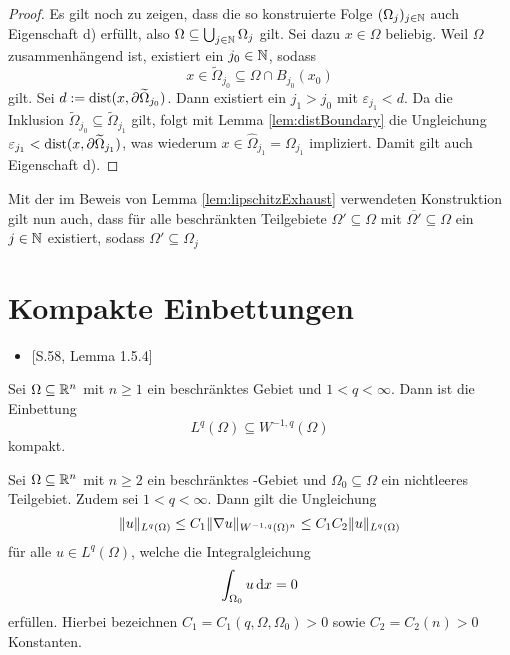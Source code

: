 \begin{proof}
  Es gilt noch zu zeigen, dass die so konstruierte Folge $(\Omega_j)_{j \in \mathbb{N}}$ auch Eigenschaft d) erfüllt, also $ \Omega \subseteq \bigcup_{j \in \mathbb{N}} \Omega_j $ gilt.
  Sei dazu $x \in \Omega$ beliebig.
  Weil $\Omega$ zusammenhängend ist, existiert ein $j_0 \in \mathbb{N}$, sodass
  $$
  x \in \widetilde\Omega_{j_0} \subseteq \Omega \cap B_{j_0}(x_0)
  $$
  gilt.
  Sei $d:=\operatorname{dist}(x, \partial\widetilde\Omega_{j_0})$.
  Dann existiert ein $j_1 > j_0$ mit $\varepsilon_{j_1} < d$.
  Da die Inklusion $\widetilde\Omega_{j_0} \subseteq \widetilde\Omega_{j_1}$ gilt, folgt mit Lemma \ref{lem:distBoundary} die Ungleichung $\varepsilon_{j_1} < \operatorname{dist}(x,\partial\widetilde\Omega_{j_1})$, was wiederum $x \in \widehat\Omega_{j_1} = \Omega_{j_1}$ impliziert.
  Damit gilt auch Eigenschaft d).
\end{proof}

\begin{bemnumber}
  \label{bem:boundedSubset}
  Mit der im Beweis von Lemma \ref{lem:lipschitzExhaust} verwendeten Konstruktion gilt nun auch, dass für alle beschränkten Teilgebiete $\Omega' \subseteq \Omega$ mit $\overline{\Omega'} \subseteq \Omega$ ein $j \in \mathbb{N}$ existiert, sodass $\Omega' \subseteq \Omega_j$
\end{bemnumber}

\section{Kompakte Einbettungen}

\begin{itemize}
  \item \cite{sohr2001navier}[S.58, Lemma 1.5.4]
\end{itemize}

\begin{lem}
  \label{lem:compactEmbedding0}
  Sei $\Omega \subseteq \mathbb{R}^n$ mit $n \geq 1$ ein beschränktes Gebiet und $1 < q < \infty$.
  Dann ist die Einbettung
  $$
  L^q(\Omega) \subseteq W^{-1,q}(\Omega)
  $$
  kompakt.
\end{lem}

\begin{lem}
  \label{lem:compactEmbedding}
  Sei $\Omega \subseteq \mathbb{R}^n$ mit $n \geq 2$ ein beschränktes \lipschitz\hyp{}Gebiet und $\Omega_0 \subseteq \Omega$ ein nichtleeres Teilgebiet.
  Zudem sei $1 < q < \infty$.
  Dann gilt die Ungleichung
  \begin{equation}
    \label{eq:compactInequality}
    \lVert u \rVert_{L^q(\Omega)} 
    \leq C_1 \lVert \nabla u \rVert_{W^{-1,q}(\Omega)^n}
    \leq C_1 C_2 \lVert u \rVert_{L^q(\Omega)}
  \end{equation}
  für alle $u \in L^q(\Omega)$, welche die Integralgleichung
  $$
  \int_{\Omega_0} u \, {\operatorname{d}\!{x}} = 0
  $$
  erfüllen.
  Hierbei bezeichnen $C_1 = C_1(q, \Omega, \Omega_0) > 0$ sowie $C_2 = C_2(n) > 0$ Konstanten.
\end{lem}

